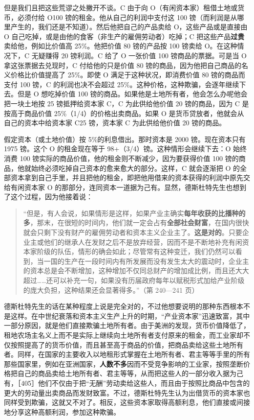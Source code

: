 但是我们且把这些荒谬之处撇开不谈。C 由于向 O（有闲资本家）租借土地或货币，必须付给 O100 镑的租金。他从自己的利润中支付这 100 镑（而利润是从哪里产生的，我们还是不知道）。然后他把自己的产品卖给 O，这些产品或是直接由 O 自己吃掉，或是由他的食客（非生产的雇佣劳动者）吃掉；C 把这些产品\textbf{过贵}卖给他，例如比价值高 25\%。他把价值 80 镑的产品按 100 镑卖给 O。在这种情况下，C 无疑赚得 20 镑利润。C 给了 O 一张价值 100 镑商品的票据。可是当 O 拿这张票据去兑现时，C 付给他的只是价值 80 镑的商品，因为他把自己商品的名义价格比价值提高了 25\%。即使 O 满足于这种状况，即消费价值 80 镑的商品而支付 100 镑，C 的利润也决不会超过 25\%。这种价格，这种欺骗，会逐年继续下去。但是 O 想吃掉价值 100 镑的商品。如果他是土地所有者，他会怎么办呢他会把一块土地按 25 镑抵押给资本家 C，C 为此供给他价值 20 镑的商品，因为 C 是按高于商品价值 25\%（1/4）的价格出卖商品。如果 O 是货币贷放者，他就会从自己的资本中给资本家 C25 镑，资本家 C 为此供给他价值 20 镑的商品。

假定资本（或土地价值）按 5\%的利息借出。那时资本是 2000 镑。现在资本只有 1975 镑。这个 O 的租金现在等于 98+（3/4）镑。这种情形会继续下去：O 始终消费 100 镑实际的商品价值，他的租金则不断减少，因为要获得价值 100 镑的商品，他就始终必须吃掉自己资本的愈来愈大的部分。这样，C 就会逐渐把 O 的全部资本拿到自己手里，并且把他的租金，即把他用借来的资本获得的利润中原先交给有闲资本家 O 的那部分，连同资本一道据为己有。显然，德斯杜特先生也想到了这个过程，因为他接着说：

\begin{quote}“但是，有人会说，如果情形是这样，如果产业主确实\textbf{每年收获的比播种的多}，那末，在很短的时间内，他们就一定会占有\textbf{全部社会财富}，在国内很快就会只剩下没有财产的雇佣劳动者和资本主义企业主了。\textbf{这是对的}。只要企业主或他们的继承人在发财之后不是放弃经营，因而不是不断地补充有闲资本家阶级的队伍，情形的确会如此；尽管常有这种变迁，我们仍然可以看到，当一国的生产在一段时间内有所发展而没有发生太大的震动时，企业主的资本总是会不断增加，这种增加不仅同总财产的增加成比例，而且还大大超过……还可以补充一句，如果没有历届政府每年以赋税形式加给产业阶级的庞大负担，这种结果还会显著得多。”（第 240—241 页）\end{quote}

德斯杜特先生的话在某种程度上说是完全对的，不过他想要说明的那种东西根本不是这样。在中世纪衰落和资本主义生产上升的时期，“产业资本家”迅速致富，其中一部分原因，就是他们直接欺骗土地所有者。由于美洲的发现，货币价值降低了，租地农场主名义上而不是实际上继续向土地所有者支付原来的租金，而工业家却不仅按照提高了的货币价值，而且甚至高于商品的价值，把商品卖给这些土地所有者。同样，在国家的主要收入以地租形式掌握在土地所有者、君主等等手里的所有那些国家里，例如在亚洲国家，\textbf{人数不多}因而不受竞争影响的工业家，按照垄断价格把自己的商品卖给土地所有者、君主等等，从而把这些人的一部分收入据为己有，［405］他们不仅由于把“无酬”劳动卖给这些人，而且由于按照比商品中包含的更大的劳动量出卖商品而发财致富。不过，德斯杜特先生认为出借货币的资本家也同样受到欺骗，这就又不对了。相反，这些资本家取得高额利息，他们直接或间接地分享这种高额利润，参加这种欺骗。

